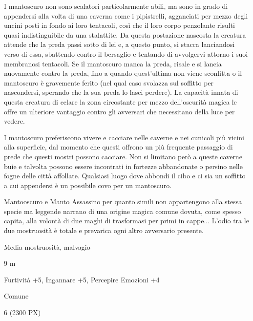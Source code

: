 \begin{multicols}{2}
{I mantoscuro non sono scalatori particolarmente abili, ma sono in grado di appendersi alla volta di una caverna come i pipistrelli, agganciati per mezzo degli uncini posti in fondo ai loro tentacoli, così che il loro corpo penzolante risulti quasi indistinguibile da una stalattite. Da questa postazione nascosta la creatura attende che la preda passi sotto di lei e, a questo punto, si stacca lanciandosi verso di essa, sbattendo contro il bersaglio e tentando di avvolgervi attorno i suoi membranosi tentacoli. Se il mantoscuro manca la preda, risale e si lancia nuovamente contro la preda, fino a quando quest'ultima non viene sconfitta o il mantoscuro è gravemente ferito (nel qual caso svolazza sul soffitto per nascondersi, sperando che la sua preda lo lasci perdere). La capacità innata di questa creatura di celare la zona circostante per mezzo dell'oscurità magica le offre un ulteriore vantaggio contro gli avversari che necessitano della luce per vedere.

I mantoscuro preferiscono vivere e cacciare nelle caverne e nei cunicoli più vicini alla superficie, dal momento che questi offrono un più frequente passaggio di prede che questi mostri possono cacciare. Non si limitano però a queste caverne buie e talvolta possono essere incontrati in fortezze abbandonate o persino nelle fogne delle città affollate. Qualsiasi luogo dove abbondi il cibo e ci sia un soffitto a cui appendersi è un possibile covo per un mantoscuro.

Mantooscuro e Manto Assassino per quanto simili non appartengono alla stessa specie ma leggende narrano di una origine magica comune dovuta, come spesso capita, alla volontà di due maghi di trasformasi per primi in cappe... L'odio tra le due mostruosità è totale e prevarica ogni altro avversario presente.

\begin{description}[noitemsep, topsep=0pt, parsep=0pt, partopsep=0pt, itemsep=1pt, leftmargin=2.35cm,  labelwidth=2.2cm, itemindent=0cm, listparindent=0pt] %
\setlength{\baselineskip}{10pt}
\item[\textbf{Taglia/Tipo}] Media mostruosità, malvagio
\item[\textbf{Caratt.}] 
\item[\textbf{Punti Ferita}] 
\item[\textbf{Movimento}] 9 m
\item[\textbf{Tiri Salvez.}] 
\item[\textbf{Comp.}] Furtività +5, Ingannare +5, Percepire Emozioni +4
\item[\textbf{Sensi}] 
\item[\textbf{Linguaggi}] Comune
\item[\textbf{Sfida}] 6 (2300 PX)
\end{description}
\smallskip

}
\end{multicols}
